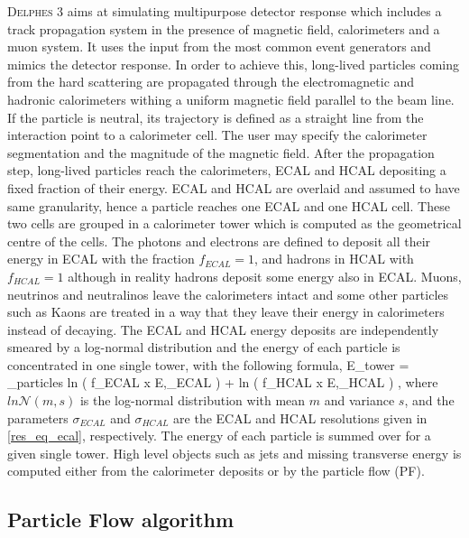 \textsc{Delphes 3} aims at simulating multipurpose detector response which includes a track propagation system in the presence of magnetic field, calorimeters and a muon system. It uses the input from the most common event generators and mimics the detector response. In order to achieve this, long-lived particles coming from the hard scattering are propagated through the electromagnetic and hadronic calorimeters withing a uniform magnetic field parallel to the beam line. If the particle is neutral, its trajectory is defined as a straight line from the interaction point to a calorimeter cell. The user may specify the calorimeter segmentation and the magnitude of the magnetic field. After the propagation step, long-lived particles reach the calorimeters, ECAL and HCAL depositing a fixed fraction of their energy. ECAL and HCAL are overlaid and assumed to have same granularity, hence a particle reaches one ECAL and one HCAL cell. These two cells are grouped in a calorimeter tower which is computed as the geometrical centre of the cells. The photons and electrons are defined to deposit all their energy in ECAL with the fraction $f_{ECAL} = 1$, and hadrons in HCAL with $f_{HCAL} = 1$ although in reality hadrons deposit some energy also in ECAL. Muons, neutrinos and neutralinos leave the calorimeters intact and some other particles such as Kaons are treated in a way that they leave their energy in calorimeters instead of decaying. The ECAL and HCAL energy deposits are independently smeared by a log-normal distribution and the energy of each particle is concentrated in one single tower, with the following formula,
\be
E_{tower} = \sum_{particles} ln \left( f_{ECAL} \; x \; E,\sigma_{ECAL} \right) + ln \left( f_{HCAL} \; x \; E,\sigma_{HCAL} \right) \; ,
\ee
where $ln\mathcal{N}\left(m,s\right)$ is the log-normal distribution with mean $m$ and variance $s$, and the parameters $\sigma_{ECAL}$ and $\sigma_{HCAL}$ are the ECAL and HCAL resolutions given in \autoref{res_eq_ecal}, respectively. The energy of each particle is summed over for a given single tower. High level objects such as jets and missing transverse energy is computed either from the calorimeter deposits or by the particle flow (PF).

\subsection{Particle Flow algorithm}\label{pf_section}

